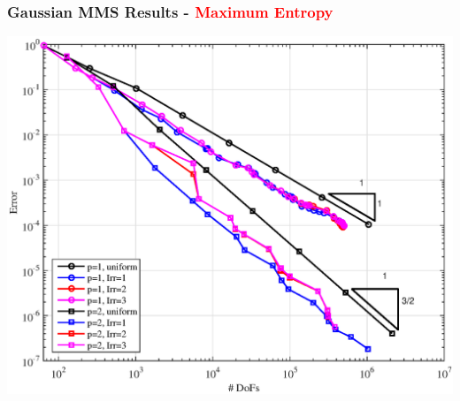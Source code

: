 \documentclass[compress,10pt]{beamer}
\newcommand{\tcr}[1]{\textcolor{red}{#1}}
\begin{document}
\begin{frame}[t]
{}
{
\frametitle{Gaussian MMS Results - \tcr{Maximum Entropy}}
\hspace*{1.25cm}
{}\includegraphics[width=0.75\columnwidth]{images/TransportMMS_Gauss2D_MAXENT_Err.eps}
}
\end{frame}
\end{document}
